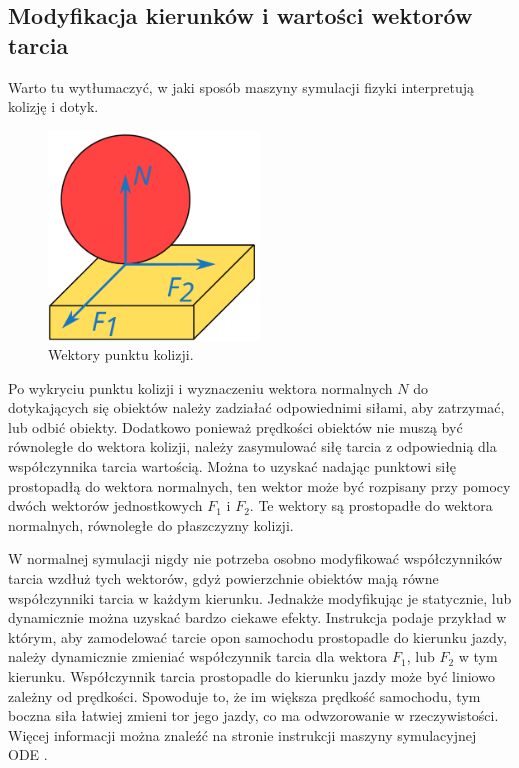 \subsection{Modyfikacja kierunków i wartości wektorów tarcia}
Warto tu wytłumaczyć, w jaki sposób maszyny symulacji fizyki interpretują kolizję i dotyk.

\begin{figure}[H]
\centering
 \includegraphics[width=0.5\textwidth]{graphics/friction.pdf}
\caption{Wektory punktu kolizji.}
\end{figure} 

Po wykryciu punktu kolizji i wyznaczeniu wektora normalnych $N$ do dotykających się obiektów należy zadziałać odpowiednimi siłami, aby zatrzymać, lub odbić obiekty.
Dodatkowo ponieważ prędkości obiektów nie muszą być równoległe do wektora kolizji, należy zasymulować siłę tarcia z odpowiednią dla współczynnika tarcia wartością.
Można to uzyskać nadając punktowi siłę prostopadłą do wektora normalnych, ten wektor może być rozpisany przy pomocy dwóch wektorów jednostkowych $F_1$ i $F_2$. 
Te wektory są prostopadłe do wektora normalnych, równoległe do płaszczyzny kolizji.

W normalnej symulacji nigdy nie potrzeba osobno modyfikować współczynników tarcia wzdłuż tych wektorów, gdyż powierzchnie obiektów mają równe współczynniki tarcia w każdym kierunku.
Jednakże modyfikując je statycznie, lub dynamicznie można uzyskać bardzo ciekawe efekty.
Instrukcja podaje przykład w którym, aby zamodelować tarcie opon samochodu prostopadle do kierunku jazdy, należy dynamicznie zmieniać współczynnik tarcia dla wektora $F_1$, lub $F_2$ w tym kierunku.
Współczynnik tarcia prostopadle do kierunku jazdy może być liniowo zależny od prędkości.
Spowoduje to, że im większa prędkość samochodu, tym boczna siła łatwiej zmieni tor jego jazdy, co ma odwzorowanie w rzeczywistości.
Więcej informacji można znaleźć na stronie instrukcji maszyny symulacyjnej ODE \cite{ode_contact}.

